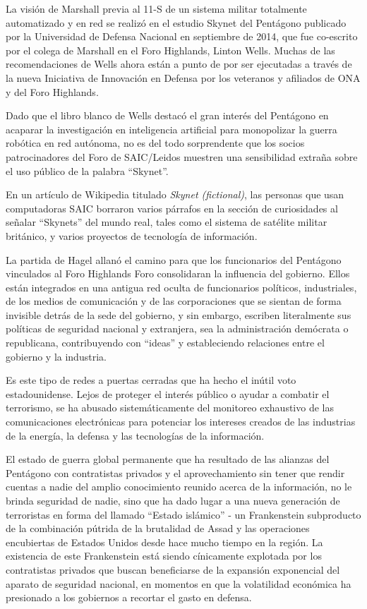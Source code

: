 \documentclass[10pt,a5paper,twoside,spanish,]{book}
\begin{document}
La visión de Marshall previa al 11-S de un sistema militar totalmente
automatizado y en red se realizó en el estudio Skynet del Pentágono
publicado por la Universidad de Defensa Nacional en septiembre de 2014,
que fue co-escrito por el colega de Marshall en el Foro Highlands,
Linton Wells. Muchas de las recomendaciones de Wells ahora están a punto
de por ser ejecutadas a través de la nueva Iniciativa de Innovación en
Defensa por los veteranos y afiliados de ONA y del Foro Highlands.

Dado que el libro blanco de Wells destacó el gran interés del Pentágono
en acaparar la investigación en inteligencia artificial para monopolizar
la guerra robótica en red autónoma, no es del todo sorprendente que los
socios patrocinadores del Foro de SAIC/Leidos muestren una sensibilidad
extraña sobre el uso público de la palabra ``Skynet''.

En un artículo de Wikipedia titulado \emph{Skynet (fictional)}, las
personas que usan computadoras SAIC borraron varios párrafos en la
sección de curiosidades al señalar ``Skynets'' del mundo real, tales
como el sistema de satélite militar británico, y varios proyectos de
tecnología de información.

La partida de Hagel allanó el camino para que los funcionarios del
Pentágono vinculados al Foro Highlands Foro consolidaran la influencia
del gobierno. Ellos están integrados en una antigua red oculta de
funcionarios políticos, industriales, de los medios de comunicación y de
las corporaciones que se sientan de forma invisible detrás de la sede
del gobierno, y sin embargo, escriben literalmente sus políticas de
seguridad nacional y extranjera, sea la administración demócrata o
republicana, contribuyendo con ``ideas'' y estableciendo relaciones
entre el gobierno y la industria.

Es este tipo de redes a puertas cerradas que ha hecho el inútil voto
estadounidense. Lejos de proteger el interés público o ayudar a combatir
el terrorismo, se ha abusado sistemáticamente del monitoreo exhaustivo
de las comunicaciones electrónicas para potenciar los intereses creados
de las industrias de la energía, la defensa y las tecnologías de la
información.

El estado de guerra global permanente que ha resultado de las alianzas
del Pentágono con contratistas privados y el aprovechamiento sin tener
que rendir cuentas a nadie del amplio conocimiento reunido acerca de la
información, no le brinda seguridad de nadie, sino que ha dado lugar a
una nueva generación de terroristas en forma del llamado ``Estado
islámico'' - un Frankenstein subproducto de la combinación pútrida de la
brutalidad de Assad y las operaciones encubiertas de Estados Unidos
desde hace mucho tiempo en la región. La existencia de este Frankenstein
está siendo cínicamente explotada por los contratistas privados que
buscan beneficiarse de la expansión exponencial del aparato de seguridad
nacional, en momentos en que la volatilidad económica ha presionado a
los gobiernos a recortar el gasto en defensa.
\end{document}
